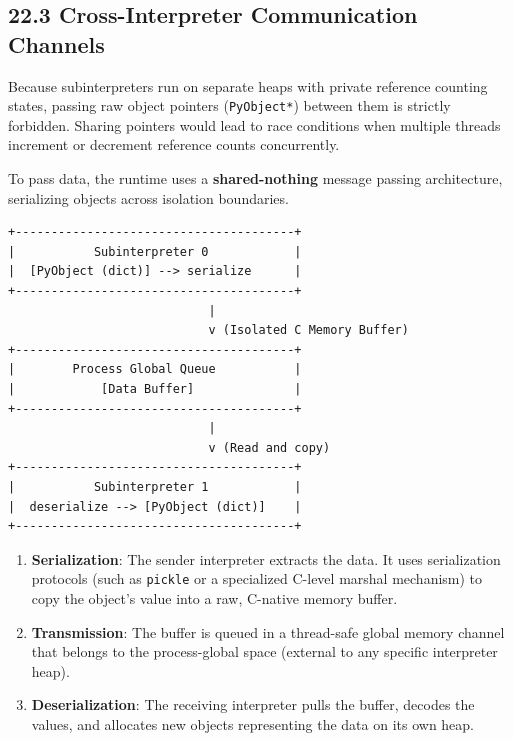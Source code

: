 \hypertarget{cross-interpreter-communication-channels}{%
\subsection{22.3 Cross-Interpreter Communication
Channels}\label{cross-interpreter-communication-channels}}

Because subinterpreters run on separate heaps with private reference
counting states, passing raw object pointers
(\passthrough{\lstinline!PyObject*!}) between them is strictly
forbidden. Sharing pointers would lead to race conditions when multiple
threads increment or decrement reference counts concurrently.

To pass data, the runtime uses a \textbf{shared-nothing} message passing
architecture, serializing objects across isolation boundaries.

\begin{lstlisting}
+---------------------------------------+
|           Subinterpreter 0            |
|  [PyObject (dict)] --> serialize      |
+---------------------------------------+
                            |
                            v (Isolated C Memory Buffer)
+---------------------------------------+
|        Process Global Queue           |
|            [Data Buffer]              |
+---------------------------------------+
                            |
                            v (Read and copy)
+---------------------------------------+
|           Subinterpreter 1            |
|  deserialize --> [PyObject (dict)]    |
+---------------------------------------+
\end{lstlisting}

\begin{enumerate}
\def\labelenumi{\arabic{enumi}.}
\tightlist
\item
  \textbf{Serialization}: The sender interpreter extracts the data. It
  uses serialization protocols (such as \passthrough{\lstinline!pickle!}
  or a specialized C-level marshal mechanism) to copy the object's value
  into a raw, C-native memory buffer.
\item
  \textbf{Transmission}: The buffer is queued in a thread-safe global
  memory channel that belongs to the process-global space (external to
  any specific interpreter heap).
\item
  \textbf{Deserialization}: The receiving interpreter pulls the buffer,
  decodes the values, and allocates new objects representing the data on
  its own heap.
\end{enumerate}

